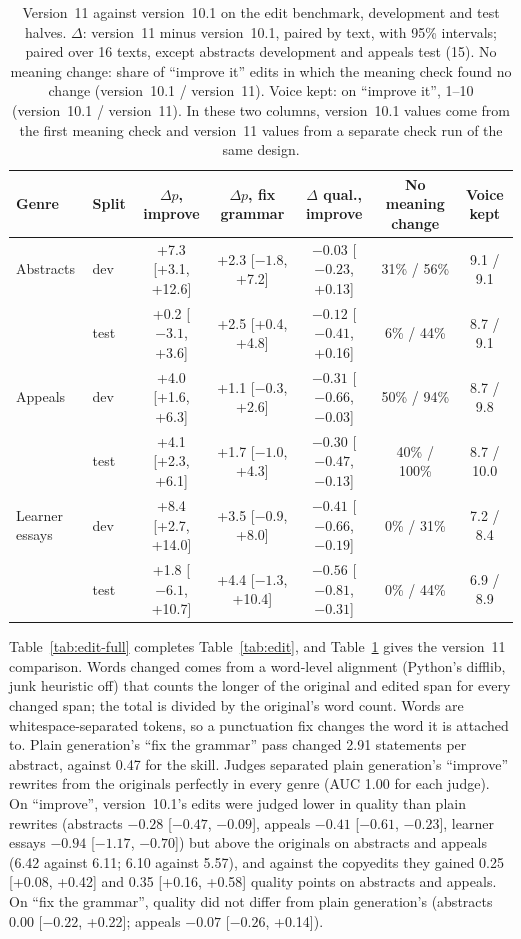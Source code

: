 \documentclass[11pt]{article}
\begin{document}
\begin{table}[t]
\centering\small
\setlength{\tabcolsep}{3pt}
\begin{tabular}{llccccc}
\toprule
Genre & Split & $\Delta p$, improve & $\Delta p$, fix grammar & $\Delta$ qual., improve & No meaning change & Voice kept \\
\midrule
Abstracts & dev & +7.3 [+3.1, +12.6] & +2.3 [$-1.8$, +7.2] & $-0.03$ [$-0.23$, +0.13] & 31\% / 56\% & 9.1 / 9.1 \\
 & test & +0.2 [$-3.1$, +3.6] & +2.5 [+0.4, +4.8] & $-0.12$ [$-0.41$, +0.16] & 6\% / 44\% & 8.7 / 9.1 \\
Appeals & dev & +4.0 [+1.6, +6.3] & +1.1 [$-0.3$, +2.6] & $-0.31$ [$-0.66$, $-0.03$] & 50\% / 94\% & 8.7 / 9.8 \\
 & test & +4.1 [+2.3, +6.1] & +1.7 [$-1.0$, +4.3] & $-0.30$ [$-0.47$, $-0.13$] & 40\% / 100\% & 8.7 / 10.0 \\
Learner essays & dev & +8.4 [+2.7, +14.0] & +3.5 [$-0.9$, +8.0] & $-0.41$ [$-0.66$, $-0.19$] & 0\% / 31\% & 7.2 / 8.4 \\
 & test & +1.8 [$-6.1$, +10.7] & +4.4 [$-1.3$, +10.4] & $-0.56$ [$-0.81$, $-0.31$] & 0\% / 44\% & 6.9 / 8.9 \\
\bottomrule
\end{tabular}
\caption{Version~11 against version~10.1 on the edit benchmark, development and test halves. $\Delta$: version~11 minus version~10.1, paired by text, with 95\% intervals; paired over 16 texts, except abstracts development and appeals test (15). No meaning change: share of ``improve it'' edits in which the meaning check found no change (version~10.1 / version~11). Voice kept: on ``improve it'', 1--10 (version~10.1 / version~11). In these two columns, version~10.1 values come from the first meaning check and version~11 values from a separate check run of the same design.}
\label{tab:v11}
\end{table}

Table~\ref{tab:edit-full} completes Table~\ref{tab:edit}, and Table~\ref{tab:v11} gives the version~11 comparison. Words changed comes from a word-level alignment (Python's difflib, junk heuristic off) that counts the longer of the original and edited span for every changed span; the total is divided by the original's word count. Words are whitespace-separated tokens, so a punctuation fix changes the word it is attached to. Plain generation's ``fix the grammar'' pass changed 2.91 statements per abstract, against 0.47 for the skill. Judges separated plain generation's ``improve'' rewrites from the originals perfectly in every genre (AUC 1.00 for each judge). On ``improve'', version~10.1's edits were judged lower in quality than plain rewrites (abstracts $-0.28$ [$-0.47$, $-0.09$], appeals $-0.41$ [$-0.61$, $-0.23$], learner essays $-0.94$ [$-1.17$, $-0.70$]) but above the originals on abstracts and appeals (6.42 against 6.11; 6.10 against 5.57), and against the copyedits they gained 0.25 [+0.08, +0.42] and 0.35 [+0.16, +0.58] quality points on abstracts and appeals. On ``fix the grammar'', quality did not differ from plain generation's (abstracts 0.00 [$-0.22$, +0.22]; appeals $-0.07$ [$-0.26$, +0.14]).
\end{document}
